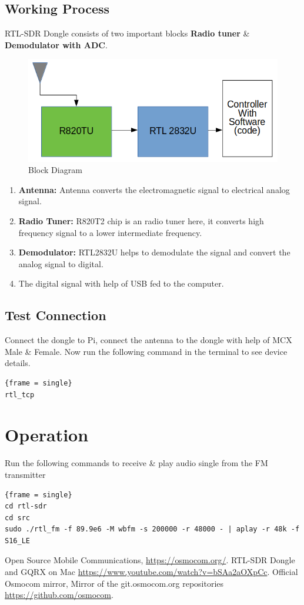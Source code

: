 \documentclass[journal,12pt,twocolumn]{IEEEtran}
\begin{document}
\subsection{Working Process}
RTL-SDR Dongle consists of two important blocks \textbf{Radio tuner} \& \textbf{Demodulator with ADC}.
\begin{figure}[h!]
\centering
\includegraphics[scale=0.32]{Figures/RTL-ARC}
\caption{Block Diagram}
\end{figure}
\begin{enumerate}
\item \textbf{Antenna:} Antenna converts the electromagnetic signal to electrical analog signal.
\item \textbf{Radio Tuner:} R820T2 chip is an radio tuner here, it converts high frequency signal to a lower intermediate frequency.
\item \textbf{Demodulator:}  RTL2832U helps to demodulate the signal and convert the analog signal to digital. 
\item The digital signal with help of USB fed to the computer. 
\end{enumerate}
\subsection{Test Connection}
Connect the dongle to Pi, connect the antenna to the dongle with help of MCX Male \& Female.  Now run the following command in the terminal to see device details.
\begin{lstlisting}{frame = single}
rtl_tcp
\end{lstlisting}
\section{Operation}
Run the following commands to receive \& play audio single from the FM transmitter
\begin{lstlisting}{frame = single}
cd rtl-sdr
cd src
sudo ./rtl_fm -f 89.9e6 -M wbfm -s 200000 -r 48000 - | aplay -r 48k -f S16_LE
\end{lstlisting}

\begin{thebibliography}{00}
 Open Source Mobile Communications, \url{https://osmocom.org/}. 
 RTL-SDR Dongle and GQRX on Mac  \url{https://www.youtube.com/watch?v=bSAa2aOXpCc}.
 Official Osmocom mirror, Mirror of the git.osmocom.org repositories \url{https://github.com/osmocom}.
\end{thebibliography}
\end{document}
